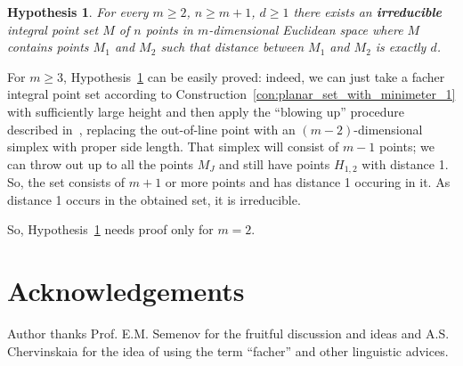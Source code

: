 \documentclass[a4paper,14pt]{article} %
\theoremstyle{plain}
\newtheorem{hypothesis}[theorem]{Hypothesis}
\theoremstyle{definition}
\begin{document}
\begin{hypothesis}
	\label{hyp:irreducible_planar}
	For every $m \geq 2$, $n \geq m+1$, $d \geq 1$ there exists an \textbf{irreducible}
	integral point set $M$ of $n$ points in $m$-dimensional Euclidean space
	where $M$ contains points $M_1$ and $M_2$ such that distance between $M_1$ and $M_2$ is exactly $d$.
\end{hypothesis}

For $m \geq 3$, Hypothesis~\ref{hyp:irreducible_planar} can be easily proved:
indeed, we can just take a facher integral point set according to Construction~\ref{con:planar_set_with_minimeter_1}
with sufficiently large height and then apply the ``blowing up'' procedure described in~\cite[Theorem 1.3]{kurz2008bounds},
replacing the out-of-line point with an $(m-2)$-dimensional simplex with proper side length.
That simplex will consist of $m-1$ points;
we can throw out up to all the points $M_J$ and still have points $H_{1,2}$ with distance 1.
So, the set consists of $m+1$ or more points and has distance 1 occuring in it.
As distance 1 occurs in the obtained set, it is irreducible.

So, Hypothesis~\ref{hyp:irreducible_planar} needs proof only for $m=2$.

\section{Acknowledgements}
Author thanks Prof. E.M. Semenov for the fruitful discussion and ideas
and A.S. Chervinskaia for the idea of using the term ``facher'' and other linguistic advices.


\printbibliography
\end{document}
